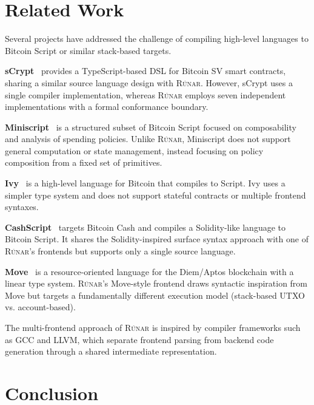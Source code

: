 \documentclass[11pt,a4paper]{article}
\newcommand{\runar}{\textsc{Rúnar}}
\begin{document}
\section{Related Work}
\label{sec:related}

Several projects have addressed the challenge of compiling high-level
languages to Bitcoin Script or similar stack-based targets.

\textbf{sCrypt}~\cite{scrypt} provides a TypeScript-based DSL for Bitcoin SV
smart contracts, sharing a similar source language design with \runar{}.
However, sCrypt uses a single compiler implementation, whereas \runar{}
employs seven independent implementations with a formal conformance boundary.

\textbf{Miniscript}~\cite{miniscript} is a structured subset of Bitcoin
Script focused on composability and analysis of spending policies. Unlike
\runar{}, Miniscript does not support general computation or state management,
instead focusing on policy composition from a fixed set of primitives.

\textbf{Ivy}~\cite{ivy} is a high-level language for Bitcoin that compiles
to Script. Ivy uses a simpler type system and does not support stateful
contracts or multiple frontend syntaxes.

\textbf{CashScript}~\cite{cashscript} targets Bitcoin Cash and compiles
a Solidity-like language to Bitcoin Script. It shares the Solidity-inspired
surface syntax approach with one of \runar{}'s frontends but supports only a
single source language.

\textbf{Move}~\cite{move} is a resource-oriented language for the Diem/Aptos
blockchain with a linear type system. \runar{}'s Move-style frontend draws
syntactic inspiration from Move but targets a fundamentally different
execution model (stack-based UTXO vs. account-based).

The multi-frontend approach of \runar{} is inspired by compiler frameworks
such as GCC and LLVM, which separate frontend parsing from backend code
generation through a shared intermediate representation.

\section{Conclusion}
\label{sec:conclusion}
\end{document}
